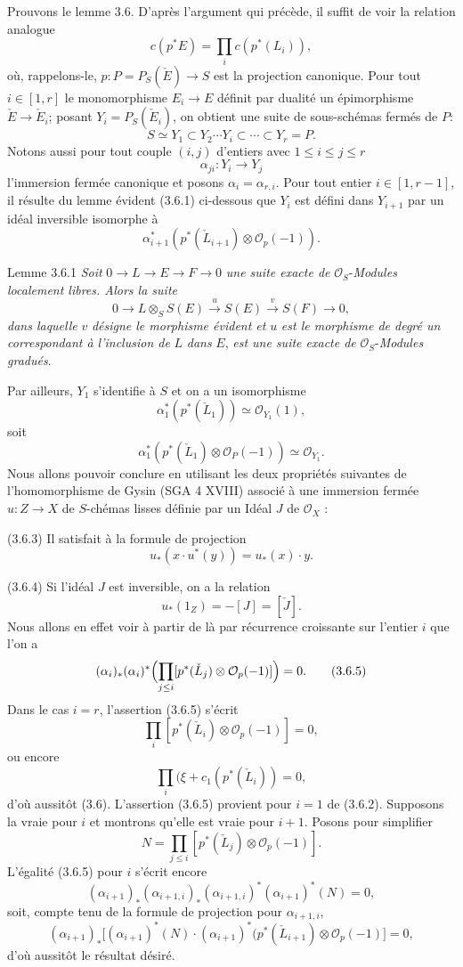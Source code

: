 Prouvons le lemme 3.6. D'après l'argument qui précède, il suffit de voir la relation analogue
\[
c(p^*E)=\prod_i c(p^*(L_i)),
\]
où, rappelons-le, $p:P=P_S(\check E)\to S$ est la projection canonique. Pour tout $i\in[1,r]$ le monomorphisme $E_i\to E$ définit par dualité un épimorphisme $\check E\to\check E_i$; posant $Y_i=P_S(\check E_i)$, on obtient une suite de sous-schémas fermés de $P$:
\[
S\simeq Y_1\subset Y_2\cdots Y_i\subset\cdots\subset Y_r=P.
\]
Notons aussi pour tout couple $(i,j)$ d'entiers avec $1\le i\le j\le r$
\[
\alpha_{ji}:Y_i\to Y_j
\]
l'immersion fermée canonique et posons $\alpha_i=\alpha_{r,i}$. Pour tout entier $i\in[1,r-1]$, il résulte du lemme évident (3.6.1) ci-dessous que $Y_i$ est défini dans $Y_{i+1}$ par un idéal inversible isomorphe à
\[
\alpha_{i+1}^*(p^*(\check L_{i+1})\otimes\mathcal{O}_p(-1)).
\]

\begin{statement}{Lemme 3.6.1}
\emph{Soit} $0\to L\to E\to F\to0$ \emph{une suite exacte de} $\mathcal{O}_S$-\emph{Modules localement libres. Alors la suite}
\[
0\to L\otimes_S S(E)\xrightarrow{u}S(E)\xrightarrow{v}S(F)\to0,
\]
\emph{dans laquelle} $v$ \emph{désigne le morphisme évident et} $u$ \emph{est le morphisme de degré un correspondant à l'inclusion de} $L$ \emph{dans} $E$, \emph{est une suite exacte de} $\mathcal{O}_S$-\emph{Modules gradués}.
\end{statement}

Par
ailleurs, $Y_1$ s'identifie à $S$ et on a un isomorphisme
\[
\alpha_1^*(p^*(\check L_1))\simeq\mathcal{O}_{Y_1}(1),
\]
soit
\[
\alpha_1^*(p^*(\check L_1)\otimes\mathcal{O}_P(-1))\simeq \mathcal{O}_{Y_1}.
\tag{3.6.2.}
\]
Nous allons pouvoir conclure en utilisant les deux propriétés suivantes de l'homomorphisme de Gysin (SGA 4 XVIII) associé à une immersion fermée $u:Z\to X$ de $S$-chémas lisses définie par un Idéal $J$ de $\mathcal{O}_X$ :

(3.6.3) Il satisfait à la formule de projection
\[
u_*(x\cdot u^*(y))=u_*(x)\cdot y.
\]

(3.6.4) Si l'idéal $J$ est inversible, on a la relation
\[
u_*(1_Z)=-[J]=[\check J].
\]
Nous allons en effet voir à partir de là par récurrence croissante sur l'entier $i$ que l'on a
\[
(\alpha_i)_*(\alpha_i)^*\Bigl(\prod_{j\le i}[p^*(\check L_j)\otimes\mathcal{O}_p(-1)]\Bigr)=0.
\tag{3.6.5}
\]
Dans le cas $i=r$, l'assertion (3.6.5) s'écrit
\[
\prod_i[p^*(\check L_i)\otimes\mathcal{O}_p(-1)]=0,
\]
ou encore
\[
\prod_i(\xi+c_1(p^*(\check L_i))=0,
\]
d'où aussitôt (3.6). L'assertion (3.6.5) provient pour $i=1$ de (3.6.2). Supposons la vraie pour $i$ et montrons qu'elle est vraie pour $i+1$. Posons pour simplifier
\[
N=\prod_{j\le i}[p^*(\check L_j)\otimes\mathcal{O}_p(-1)].
\]
L'égalité (3.6.5) pour $i$ s'écrit encore
\[
(\alpha_{i+1})_*(\alpha_{i+1,i})_*(\alpha_{i+1,i})^*(\alpha_{i+1})^*(N)=0,
\]
soit, compte tenu de la formule de projection pour $\alpha_{i+1,i}$,
\[
(\alpha_{i+1})_*\bigl[(\alpha_{i+1})^*(N)\cdot(\alpha_{i+1})^*(p^*(\check L_{i+1})\otimes\mathcal{O}_p(-1)\bigr]=0,
\]
d'où aussitôt le
résultat désiré.


